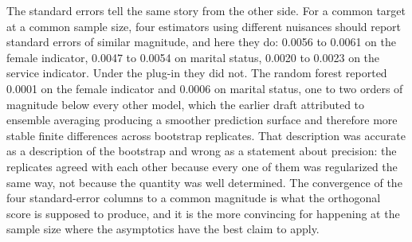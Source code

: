 \documentclass[12pt]{article}
\begin{document}
	The standard errors tell the same story from the other side. For a common target at a common sample size, four estimators using different nuisances should report standard errors of similar magnitude, and here they do: 0.0056 to 0.0061 on the female indicator, 0.0047 to 0.0054 on marital status, 0.0020 to 0.0023 on the service indicator. Under the plug-in they did not. The random forest reported 0.0001 on the female indicator and 0.0006 on marital status, one to two orders of magnitude below every other model, which the earlier draft attributed to ensemble averaging producing a smoother prediction surface and therefore more stable finite differences across bootstrap replicates. That description was accurate as a description of the bootstrap and wrong as a statement about precision: the replicates agreed with each other because every one of them was regularized the same way, not because the quantity was well determined. The convergence of the four standard-error columns to a common magnitude is what the orthogonal score is supposed to produce, and it is the more convincing for happening at the sample size where the asymptotics have the best claim to apply.
	
\end{document}
